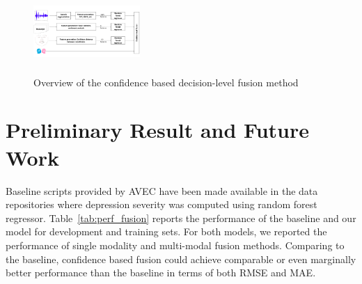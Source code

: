 \documentclass[letterpaper]{article} %
\begin{document}
\begin{figure}[ht]
\centering
\includegraphics[width=0.36000000000000004\textwidth,height=1.23in ]{framework}
\caption{Overview of the confidence based decision-level fusion method}
\label{fig:framework}
\end{figure}

\vspace{-3.09mm}
\section{Preliminary Result and Future Work }
Baseline scripts provided by AVEC have been made available in the data repositories where depression severity was computed using random forest regressor.
Table~\ref{tab:perf_fusion} reports the performance of the baseline and our model for development and training sets. For both models, we reported the performance of single modality and multi-modal fusion methods. Comparing to the baseline, confidence based fusion could achieve comparable or even marginally better performance than the baseline in terms of both RMSE and MAE.
\end{document}
